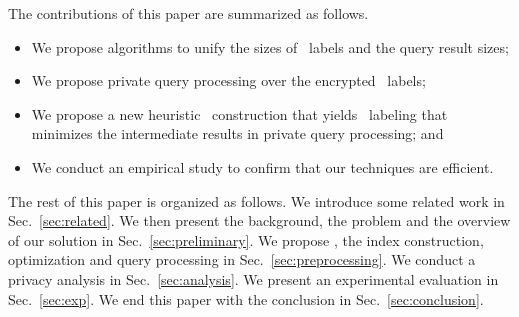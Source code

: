\noindent The contributions of this paper are summarized as follows.
\vspace{-1ex}
\begin{itemize}%

        \item We propose algorithms to  unify the sizes of \hop\ labels and the
            query result sizes; 

        \item We propose private query
            processing over the  encrypted \hop\ labels;

        \item We propose  a new heuristic \hop\ construction that yields \hop\
            labeling that minimizes the intermediate results in private query
            processing; and

        \item We conduct an empirical study to confirm that our techniques are efficient.
\end{itemize}
\vspace{-1ex}

The rest of this paper is organized as follows. We
introduce some related work in Sec.~\ref{sec:related}. We then present the
background, the problem and the overview of our solution in Sec.~\ref{sec:preliminary}. We
propose \pphop, the index construction, optimization  and query processing in
Sec.~\ref{sec:preprocessing}. We conduct a  privacy analysis in
Sec.~\ref{sec:analysis}. We present an experimental evaluation in
Sec.~\ref{sec:exp}. We end this paper with the conclusion in
Sec.~\ref{sec:conclusion}.





















